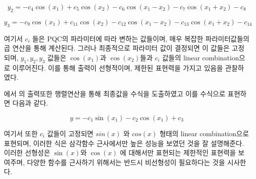 \begin{equation*}
y_2  = - c_4\cos{\left(x_{1} \right)} + c_5\cos{\left(x_{2} \right)} - c_6\cos{\left(x_{1} - x_{2} \right)} - c_7\cos{\left(x_{1} + x_{2} \right)} - c_8
\end{equation*}

\begin{equation*}
   y_3 =  -c_9 \cos{\left(x_{1} \right)} + c_{11} \cos{\left(x_{2} \right)} - c_{12} \cos{\left(x_{1} - x_{2} \right)} - c_{13} \cos{\left(x_{1} + x_{2} \right)} - c_{14}
\end{equation*}


여기서 $ c_i $ 들은 PQC의 파라미터에 따라 변하는 값들이며, 매우 복잡한 파라미터값들의 곱 연산을 통해 계산된다. 그러나 최종적으로 파라미터 값이 결정되면 이 값들은 고정되며, $ y_1 ,y_2 , y_3 $ 값들은  $\cos(x_1)$과 $\cos(x_2)$들과 $c_i$ 값들의 linear combination으로 이루어진다. 이를 통해 출력이 선형적이며, 제한된 표현력을 가지고 있음을 관찰하였다.

\clearpage

에서 의 출력또한 행렬연산을 통해 최종값을 수식을 도출하였고 이를 수식으로 표현하면 다음과 같다.

\begin{equation*}
 y = - c_1 \sin{\left(x_{1} \right)} - c_2 \cos{\left(x_{1} \right)} + c_3
\end{equation*}

여기서 또한 $c_i$ 값들이 고정되면  $sin(x)$ 와 $cos(x)$ 형태의 linear combination으로 표현되며, 이러한 식은 삼각함수 근사에서만 높은 성능을 보였던 것을 잘 설명해준다. 이러한 선형성은 $\sin(x)$와 $\cos(x)$ 에 대해서만 표현되는 제한적인 표현력을 보여주며, 다양한 함수를 근사하기 위해서는 반드시 비선형성이 필요하다는 것을 시사한다.

